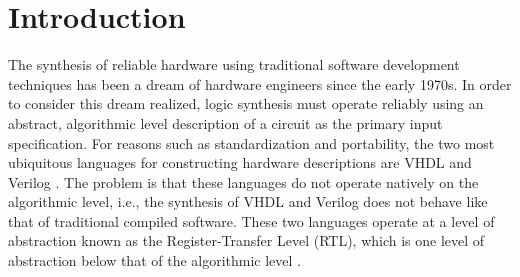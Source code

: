 \documentclass[11pt,journal,compsoc, onecolumn]{IEEEtran}
\begin{document}
\section{Introduction}

\indent The synthesis of reliable hardware using traditional software development techniques has been a dream of hardware engineers since the early 1970s\cite{1}. In order to consider this dream realized, logic synthesis must operate reliably using an abstract, algorithmic level description of a circuit as the primary input specification\cite{mcfarland}. For reasons such as standardization\cite{ieee} and portability\cite{churtl}, the two most ubiquitous languages for constructing hardware descriptions are VHDL and Verilog \cite{Harris+Harris}. The problem is that these languages do not operate natively on the algorithmic level, i.e., the synthesis of VHDL and Verilog does not behave like that of traditional compiled software. These two languages operate at a level of abstraction known as the Register-Transfer Level (RTL), which is one level of abstraction below that of the algorithmic level \cite{vahid}. 
\end{document}
